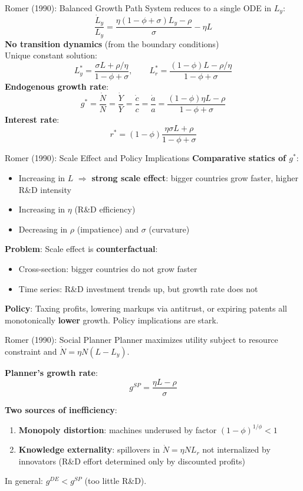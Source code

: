 \documentclass[blue]{beamer}
\begin{document}
	\begin{frame}{Romer (1990): Balanced Growth Path}
		System reduces to a single ODE in $L_y$:
		\[
		\frac{\dot{L}_y}{L_y} = \frac{\eta(1-\phi+\sigma)L_y - \rho}{\sigma} - \eta L 
		\]
		\textbf{No transition dynamics} (from the boundary conditions)\\ Unique constant solution:
		\[
		L_y^* = \frac{\sigma L + \rho/\eta}{1-\phi+\sigma}, \qquad L_r^* = \frac{(1-\phi)L - \rho/\eta}{1-\phi+\sigma}
		\]
		\textbf{Endogenous growth rate}:
		\[
		g^* = \frac{\dot{N}}{N} = \frac{\dot{Y}}{Y} = \frac{\dot{c}}{c} = \frac{\dot{a}}{a} = \frac{(1-\phi)\eta L - \rho}{1-\phi+\sigma}
		\]
		\textbf{Interest rate}: 
		$$r^* = (1-\phi)\frac{\eta\sigma L + \rho}{1-\phi+\sigma}
		$$
	\end{frame}
	
	\begin{frame}{Romer (1990): Scale Effect and Policy Implications}
		\textbf{Comparative statics of $g^*$}:
		\begin{itemize}
			\item Increasing in $L$ $\Rightarrow$ \textbf{strong scale effect}: bigger countries grow faster, higher R\&D intensity
			\item Increasing in $\eta$ (R\&D efficiency)
			\item Decreasing in $\rho$ (impatience) and $\sigma$ (curvature)
		\end{itemize}
		
		\textbf{Problem}: Scale effect is \textbf{counterfactual}:
		\begin{itemize}
			\item Cross-section: bigger countries do not grow faster
			\item Time series: R\&D investment trends up, but growth rate does not
		\end{itemize}
		
		\textbf{Policy}: Taxing profits, lowering markups via antitrust, or expiring patents all monotonically \textbf{lower} growth. Policy implications are stark.
	\end{frame}
	
	
	\begin{frame}{Romer (1990): Social Planner}
		Planner maximizes utility subject to resource constraint and $\dot{N} = \eta N(L - L_y)$.
		
		\textbf{Planner's growth rate}:
		\[
		g^{SP} = \frac{\eta L - \rho}{\sigma} 
		\]
		
		\textbf{Two sources of inefficiency}:
		\begin{enumerate}
			\item \textbf{Monopoly distortion}: machines underused by factor $(1-\phi)^{1/\phi} < 1$
			
			\item \textbf{Knowledge externality}: spillovers in $\dot{N} = \eta N L_r$ not internalized by innovators (R\&D effort determined only by discounted profits)
	
		\end{enumerate}
		
		In general: $g^{DE} < g^{SP}$ (too little R\&D).
	\end{frame}
	
\end{document}
